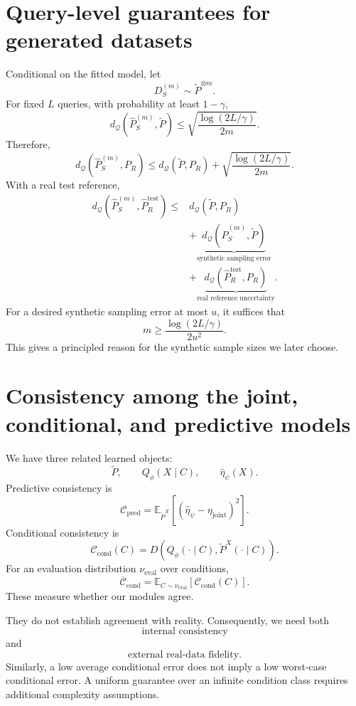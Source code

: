 \documentclass[11pt,a4paper]{article}
\begin{document}
\section{Query-level guarantees for generated datasets}
Conditional on the fitted model, let
\[
D_S^{(m)}\sim\widetilde P^{\otimes m}.
\]
For fixed $L$ queries, with probability at least $1-\gamma$,
\[
\boxed{d_{\mathcal Q}\left(\widehat P_S^{(m)},\widetilde P\right)
\leq\sqrt{\frac{\log(2L/\gamma)}{2m}}.}
\]
Therefore,
\[
\boxed{d_{\mathcal Q}\left(\widehat P_S^{(m)},P_R\right)
\leq d_{\mathcal Q}(\widetilde P,P_R)
+\sqrt{\frac{\log(2L/\gamma)}{2m}}.}
\]
With a real test reference,
\[
\begin{aligned}
d_{\mathcal Q}\left(\widehat P_S^{(m)},\widehat P_R^{\mathrm{test}}\right)
\leq{}&d_{\mathcal Q}(\widetilde P,P_R)\\
&+\underbrace{d_{\mathcal Q}(\widehat P_S^{(m)},\widetilde P)}_{\text{synthetic sampling error}}\\
&+\underbrace{d_{\mathcal Q}(\widehat P_R^{\mathrm{test}},P_R)}_{\text{real reference uncertainty}}.
\end{aligned}
\]
For a desired synthetic sampling error at most $u$, it suffices that
\[
\boxed{m\geq\frac{\log(2L/\gamma)}{2u^2}.}
\]
This gives a principled reason for the synthetic sample sizes we later choose.

\section{Consistency among the joint, conditional, and predictive models}
We have three related learned objects:
\[
\widetilde P,\qquad Q_\phi(X\mid C),\qquad\widehat\eta_\psi(X).
\]
Predictive consistency is
\[
\mathcal C_{\mathrm{pred}}=\mathbb E_{\widetilde P^X}
\left[(\widehat\eta_\psi-\eta_{\mathrm{joint}})^2\right].
\]
Conditional consistency is
\[
\mathcal C_{\mathrm{cond}}(C)=D\left(Q_\phi(\cdot\mid C),
\widetilde P^X(\cdot\mid C)\right).
\]
For an evaluation distribution $\nu_{\mathrm{eval}}$ over conditions,
\[
\overline{\mathcal C}_{\mathrm{cond}}=
\mathbb E_{C\sim\nu_{\mathrm{eval}}}[\mathcal C_{\mathrm{cond}}(C)].
\]
These measure whether our modules agree.

They do not establish agreement with reality. Consequently, we need both
\[
\text{internal consistency}
\]
and
\[
\text{external real-data fidelity}.
\]
Similarly, a low average conditional error does not imply a low worst-case conditional error. A uniform guarantee over an infinite condition class requires additional complexity assumptions.
\end{document}
